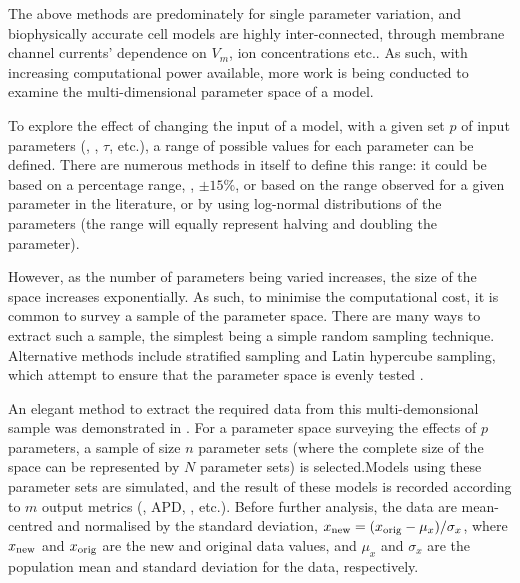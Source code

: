 \documentclass[../thesis-main.tex]{subfiles}
\begin{document}
The above methods are predominately for single parameter variation, and biophysically accurate cell models are highly inter-connected, through membrane channel currents' dependence on $V_m$, ion concentrations etc.. As such, with increasing computational power available, more work is being conducted to examine the multi-dimensional parameter space of a model.

To explore the effect of changing the input of a model, with a given set $p$ of input parameters (\eg{}, \gnak{}, $\tau$, etc.), a range of possible values for each parameter can be defined. There are numerous methods in itself to define this range: it could be based on a percentage range, \eg{}, $\pm15\%$, or based on the range observed for a given parameter in the literature, or by using log-normal distributions of the parameters (the range will equally represent halving and doubling the parameter).

However, as the number of parameters being varied increases, the size of the space increases exponentially. As such, to minimise the computational cost, it is common to survey a sample of the parameter space. There are many ways to extract such a sample, the simplest being a simple random sampling technique. Alternative methods include stratified sampling and Latin hypercube sampling, which attempt to ensure that the parameter space is evenly tested \citep{McKay1979}.

An elegant method to extract the required data from this multi-demonsional sample was demonstrated in \citet{Sobie2009}. For a parameter space surveying the effects of $p$ parameters, a sample of size $n$ parameter sets (where the complete size of the space can be represented by $N$ parameter sets) is selected.Models using these parameter sets are simulated, and the result of these models is recorded according to $m$ output metrics (\eg{}, APD, \casys{}, etc.). Before further analysis, the data are mean-centred and normalised by the standard deviation, \idest{} $x_\textnormal{new} = (x_\textnormal{orig}-\mu_x)/\sigma_x$, where $x_\textnormal{new}$ and $x_\textnormal{orig}$ are the new and original data values, and $\mu_x$ and $\sigma_x$ are the population mean and standard deviation for the data, respectively.
\end{document}
